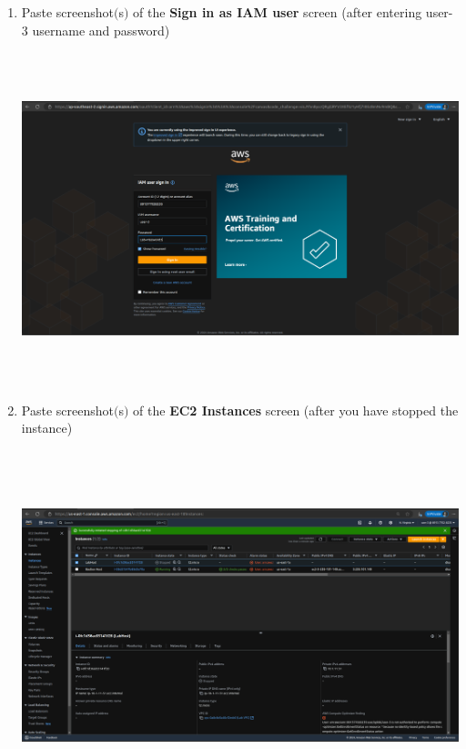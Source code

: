 \documentclass[11pt]{article}
\begin{document}
\begin{enumerate}[resume]
    \vspace{75mm}

    \item Paste screenshot$($s$)$ of the \textbf{Sign in as IAM user} screen (after entering user-3 username and password) \\
    \vspace{5mm}

    {\centering
    \includegraphics[width=6.1in, height=3.8in]{pics/13.png}
    }



    \item Paste screenshot$($s$)$ of the \textbf{EC2 Instances} screen (after you have stopped the instance) \\
    \vspace{5mm}

    {\centering
    \includegraphics[width=6.1in, height=4in]{pics/14.png}
    }
        
\end{enumerate}
\end{document}
